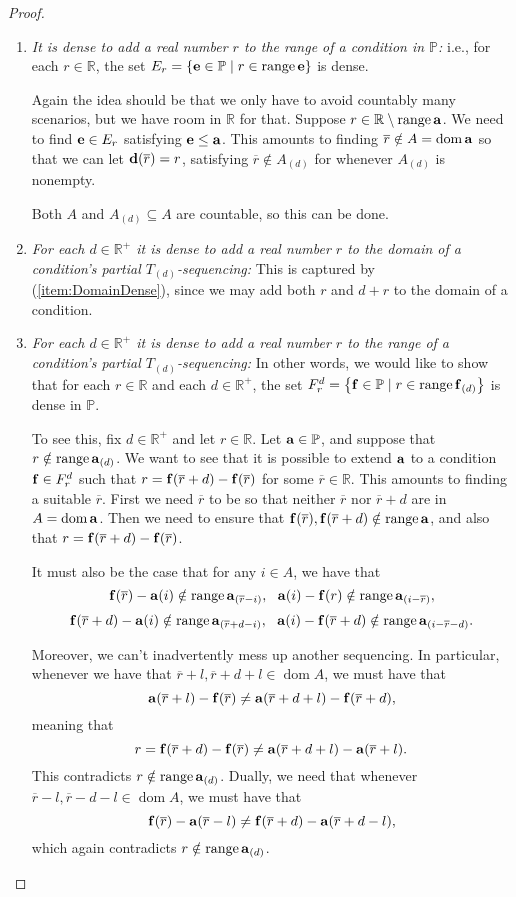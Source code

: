 \documentclass[11pt]{amsart}
\theoremstyle{definition}
\theoremstyle{remark}
\renewcommand{\P}{\mathbb{P}}
\newcommand{\R}{\mathbb{R}}
\DeclareMathOperator{\ran}{range}
\DeclareMathOperator{\dom}{dom}
\newcommand{\st}{\; | \;}
\newcommand{\set}[2]{\left\{#1\st #2 \right\}}
\renewcommand{\a}{\textup{\textbf{a}}}
\renewcommand{\d}{\textup{\textbf{d}}}
\newcommand{\e}{\textup{\textbf{e}}}
\newcommand{\f}{\textup{\textbf{f}}}
\renewcommand{\r}{\overline r}
\begin{document}
\begin{proof}
\begin{enumerate}
	\item \emph{It is dense to add a real number $r$ to the range of a condition in $\P$:} i.e., for each $r \in \R$, the set $E_r=\set{\e \in \P}{r \in \ran \e }$ is dense. 
	
	Again the idea should be that we only have to avoid countably many scenarios, but we have room in $\R$ for that. Suppose $r \in \R \setminus \ran \a$. We need to find $\e \in E_r$ satisfying $\e \leq \a$. This amounts to finding $\r \notin A = \dom \a$ so that we can let $\d(\overline r)=r$, satisfying $\r \notin A_{(d)}$ for whenever $A_{(d)}$ is nonempty.
	
	Both $A$ and $A_{(d)} \subseteq A$ are countable, so this can be done. \\
		
	\item \label{item:StepFunctionDomainDense} \emph{For each $d \in \R^+$ it is dense to add a real number $r$ to the domain of a condition's partial $T_{(d)}$-sequencing:} This is captured by (\ref{item:DomainDense}), since we may add both $r$ and $d+r$ to the domain of a condition.\\
	\item \emph{For each $d \in \R^+$ it is dense to add a real number $r$ to the range of a condition's partial $T_{(d)}$-sequencing:} In other words, we would like to show that for each $r \in \R$ and each $d \in \R^+$, the set $F^d_r=\set{\f \in \P}{r \in \ran \f_{(d)}}$ is dense in $\P$. 
	
	To see this, fix $d \in \R^+$ and let $r \in \R$. Let $\a \in \P$, and suppose that $r \notin \ran\a_{(d)}$. We want to see that it is possible to extend $\a$ to a condition $\f \in F^d_r$ such that $r=\f(\r+d)-\f(\r)$ for some $\r \in \R$. This amounts to finding a suitable $\r$. First we need $\r$ to be so that neither $\r$ nor $\r+d$ are in $A = \dom \a$. Then we need to ensure that $\f(\r), \f(\r+d) \notin \ran \a$, and also that $r=\f(\r+d)-\f(\r)$. 

	It must also be the case that for any $i\in A$, we have that 
		$$\f(\r)-\a(i) \notin \ran \a_{(\r-i)}, \ \  \a(i)-\f(r) \notin \ran \a_{(i-\r)},$$ 
		$$\f(\r+d) - \a(i) \notin \ran \a_{(\r+d-i)}, \ \ \a(i) - \f(\r+d) \notin \ran \a_{(i-\r-d)}.$$

Moreover, we can't inadvertently mess up another sequencing. In particular, whenever we have that $\r+l, \r+d+l \in \dom A$, we must have that $$\a(\r+l)-\f(\r)\neq \a(\r+d+l) - \f(\r+d),$$ meaning that $$r= \f(\r+d)-\f(\r) \neq \a(\r+d+l) - \a(\r+l).$$ This contradicts $r \notin \ran \a_{(d)}$. Dually, we need that whenever $\r-l, \r-d-l \in \dom A$, we must have that $$\f(\r)-\a(\r-l) \neq \f(\r+d)-\a(\r+d-l),$$ which again contradicts $r \notin \ran \a_{(d)}$.


\end{enumerate}
\end{proof}
\end{document}
